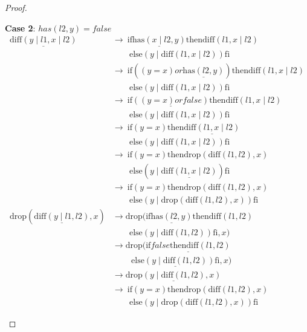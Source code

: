 \documentclass[12pt, a4paper]{article}
\newcommand{\rel}[1]{\mathrel{#1}}
\newcommand{\rmx}[1]{\mathrm{#1}}
\newcommand{\larrow}{\longrightarrow}
\newcommand{\under}{\underline}
\begin{document}
\begin{proof}
\begin{description}
\textbf{Case 2}: $has(l2, y) = false$
\begin{align*}
\under{\rmx{diff}(y \mid l1, x \mid l2)}
	&\larrow\ \rel{\rmx{if}} \under{\rmx{has}(x \mid l2, y)} \rel{\rmx{then}} \rmx{diff}(l1, x \mid l2) \\
	&\quad \quad \rel{\rmx{else}} (y \mid \rmx{diff}(l1, x \mid l2)) \rel{\rmx{fi}} \tag{by diff2} \\
	&\larrow\ \rel{\rmx{if}} ((y = x) \rel{or} \under{\rmx{has}(l2, y)}) \rel{\rmx{then}} \rmx{diff}(l1, x \mid l2) \\
	&\quad \quad \rel{\rmx{else}} (y \mid \rmx{diff}(l1, x \mid l2)) \rel{\rmx{fi}} \tag{by has2} \\
	&\larrow\ \rel{\rmx{if}} \under{((y = x) \rel{or} false)} \rel{\rmx{then}} \rmx{diff}(l1, x \mid l2) \\
	&\quad \quad \rel{\rmx{else}} (y \mid \rmx{diff}(l1, x \mid l2)) \rel{\rmx{fi}} \tag{by case splitting} \\
	&\larrow\ \rel{\rmx{if}} (y = x) \rel{\rmx{then}} \under{\rmx{diff}(l1, x \mid l2)} \\
	&\quad \quad \rel{\rmx{else}} (y \mid \rmx{diff}(l1, x \mid l2)) \rel{\rmx{fi}} \tag{by or} \\
	&\larrow\ \rel{\rmx{if}} (y = x) \rel{\rmx{then}} \rmx{drop}(\rmx{diff}(l1, l2), x) \\
	&\quad \quad \rel{\rmx{else}} (y \mid \under{\rmx{diff}(l1, x \mid l2)}) \rel{\rmx{fi}} \tag{by IH} \\
	&\larrow\ \rel{\rmx{if}} (y = x) \rel{\rmx{then}} \rmx{drop}(\rmx{diff}(l1, l2), x) \\
	&\quad \quad \rel{\rmx{else}} (y \mid \rmx{drop}(\rmx{diff}(l1, l2), x)) \rel{\rmx{fi}} \tag{by IH} \\
\rmx{drop}(\under{\rmx{diff}(y \mid l1, l2)}, x)
	&\larrow \rmx{drop}(\rel{\rmx{if}} \under{\rmx{has}(l2, y)} \rel{\rmx{then}} \rmx{diff}(l1, l2) \\
	&\quad \quad \rel{\rmx{else}} (y \mid \rmx{diff}(l1, l2)) \rel{\rmx{fi}}, x) \tag{by diff2} \\
	&\larrow \rmx{drop}(\under{\rel{\rmx{if}} false \rel{\rmx{then}} \rmx{diff}(l1, l2)} \\
	&\quad \quad\ \under{\rel{\rmx{else}} (y \mid \rmx{diff}(l1, l2)) \rel{\rmx{fi}}}, x) \tag{by case splitting} \\
	&\larrow \under{\rmx{drop}(y \mid \rmx{diff}(l1, l2), x)} \tag{by if2} \\
	&\larrow\ \rel{\rmx{if}} (y = x) \rel{\rmx{then}} \rmx{drop}(\rmx{diff}(l1, l2), x) \\
	&\quad \quad \rel{\rmx{else}} (y \mid \rmx{drop}(\rmx{diff}(l1, l2), x)) \rel{\rmx{fi}} \tag{by drop2}
\end{align*}
\end{description}

\end{proof}
\end{document}
